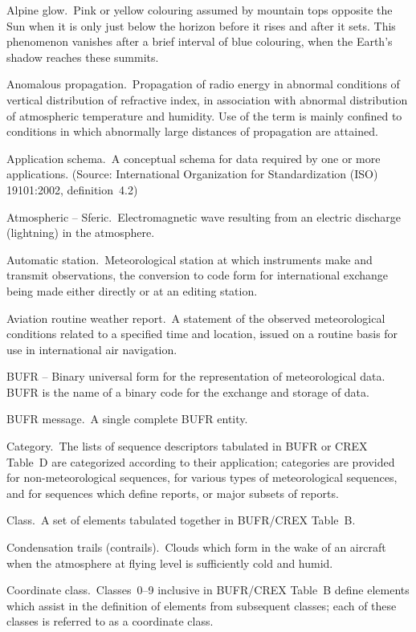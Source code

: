 Alpine glow. Pink or yellow colouring assumed by mountain tops opposite the Sun when it is only just below the horizon before it rises and after it sets. This phenomenon vanishes after a brief interval of blue colouring, when the Earth's shadow reaches these summits.

Anomalous propagation. Propagation of radio energy in abnormal conditions of vertical distribution of refractive index, in association with abnormal distribution of atmospheric temperature and humidity. Use of the term is mainly confined to conditions in which abnormally large distances of propagation are attained.

Application schema. A conceptual schema for data required by one or more applications. (Source: International Organization for Standardization (ISO) 19101:2002, definition~4.2)

Atmospheric -- Sferic. Electromagnetic wave resulting from an electric discharge (lightning) in the atmosphere.

Automatic station. Meteorological station at which instruments make and transmit observations, the conversion to code form for international exchange being made either directly or at an editing station.

Aviation routine weather report. A statement of the observed meteorological conditions related to a specified time and location, issued on a routine basis for use in international air navigation.

BUFR -- Binary universal form for the representation of meteorological data. BUFR is the name of a binary code for the exchange and storage of data.

BUFR message. A single complete BUFR entity.

Category. The lists of sequence descriptors tabulated in BUFR or CREX Table~D are categorized according to their application; categories are provided for non-meteorological sequences, for various types of meteorological sequences, and for sequences which define reports, or major subsets of reports.

Class. A set of elements tabulated together in BUFR/CREX Table~B.

Condensation trails (contrails). Clouds which form in the wake of an aircraft when the atmosphere at flying level is sufficiently cold and humid.

Coordinate class. Classes~0--9 inclusive in BUFR/CREX Table~B define elements which assist in the definition of elements from subsequent classes; each of these classes is referred to as a coordinate class.

